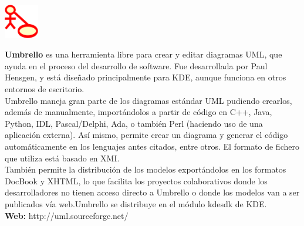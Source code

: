 \begin{center}
	\includegraphics[height=1.5cm]{images/umbrello}\\
\end{center}
\textbf{Umbrello} es una herramienta libre para crear y editar diagramas UML, que ayuda en el proceso del desarrollo de software. Fue desarrollada por Paul Hensgen, y está diseñado principalmente para KDE, aunque funciona en otros entornos de escritorio.\\

Umbrello maneja gran parte de los diagramas estándar UML pudiendo crearlos, además de manualmente, importándolos a partir de código en C++, Java, Python, IDL, Pascal/Delphi, Ada, o también Perl (haciendo uso de una aplicación externa). Así mismo, permite crear un diagrama y generar el código automáticamente en los lenguajes antes citados, entre otros. El formato de fichero que utiliza está basado en XMI.\\

También permite la distribución de los modelos exportándolos en los formatos DocBook y XHTML, lo que facilita los proyectos colaborativos donde los desarrolladores no tienen acceso directo a Umbrello o donde los modelos van a ser publicados vía web.Umbrello se distribuye en el módulo kdesdk de KDE.\\

\textbf{Web:} http://uml.sourceforge.net/

